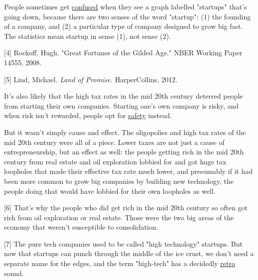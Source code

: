 People sometimes get
                  \href{https://www.inc.com/magazine/201505/leigh-buchanan/the-vanishing-startups-in-decline.html}{\underline{confused}}
                  when they see a graph labelled "startups" that's going down,
                  because there are two senses of the word "startup": (1) the
                  founding of a company, and (2) a particular type of company
                  designed to grow big fast. The statistics mean startup in
                  sense (1), not sense (2).

[4] Rockoff, Hugh. "Great Fortunes of the Gilded Age." NBER
                  Working Paper 14555, 2008.

[5] Lind, Michael. \emph{Land of Promise.} HarperCollins,
                  2012.

It's also likely that the high tax rates in
                  the mid 20th century deterred people from starting their own
                  companies. Starting one's own company is risky, and when risk
                  isn't rewarded, people opt for
                  \href{http://www.paulgraham.com/inequality.html}{\underline{safety}}
                  instead.

But it wasn't simply cause and effect. The
                  oligopolies and high tax rates of the mid 20th century were
                  all of a piece. Lower taxes are not just a cause of
                  entrepreneurship, but an effect as well: the people getting
                  rich in the mid 20th century from real estate and oil
                  exploration lobbied for and got huge tax loopholes that made
                  their effective tax rate much lower, and presumably if it had
                  been more common to grow big companies by building new
                  technology, the people doing that would have lobbied for their
                  own loopholes as well.

[6] That's why the people who did get rich in the mid 20th
                  century so often got rich from oil exploration or real estate.
                  Those were the two big areas of the economy that weren't
                  susceptible to consolidation.

[7] The pure tech companies used to be called "high technology"
                  startups. But now that startups can punch through the middle
                  of the ice crust, we don't need a separate name for the edges,
                  and the term "high-tech" has a decidedly
                  \href{https://books.google.com/ngrams/graph?content=high+tech\&year\_start=1900\&year\_end=2019\&corpus=en-2019\&smoothing=3}{\underline{retro}}
                  sound.

